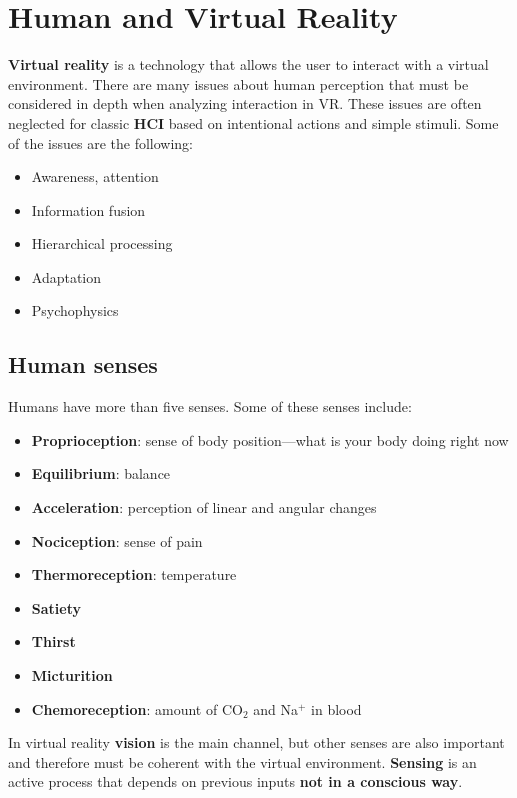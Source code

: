 \documentclass[11pt,a4paper]{article}
\theoremstyle{definition}
\theoremstyle{plain}
\theoremstyle{remark}
\begin{document}
\section{Human and Virtual Reality}
\textbf{Virtual reality} is a technology that allows the user to interact with a virtual environment.
There are many issues about human perception that must be considered in depth when analyzing interaction in VR.
These issues are often neglected for classic \textbf{HCI} based on intentional actions and simple stimuli.
Some of the issues are the following:
\begin{itemize}
    \item Awareness, attention
    \item Information fusion
    \item Hierarchical processing
    \item Adaptation
    \item Psychophysics
\end{itemize}

\subsection{Human senses}

Humans have more than five senses.
Some of these senses include:
\begin{itemize}
    \item \textbf{Proprioception}: sense of body position—what is your
    body doing right now
    \item \textbf{Equilibrium}: balance
    \item \textbf{Acceleration}: perception of linear and angular changes
    \item \textbf{Nociception}: sense of pain
    \item \textbf{Thermoreception}: temperature
    \item \textbf{Satiety}
    \item \textbf{Thirst}
    \item \textbf{Micturition}
    \item \textbf{Chemoreception}: amount of CO$_2$ and Na$^+$ in blood
\end{itemize}

In virtual reality \textbf{vision} is the main channel, but other senses are also 
important and therefore must be coherent with the virtual environment.
\textbf{Sensing} is an active process that depends on previous inputs \textbf{not in a conscious way}.
\end{document}
